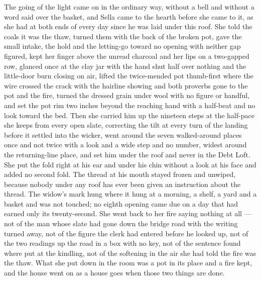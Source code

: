 The going of the light came on in the ordinary way, without a bell and without a word said over the basket, and Sella came to the hearth before she came to it, as she had at both ends of every day since he was laid under this roof. She told the coals it was the thaw, turned them with the back of the broken pot, gave the small intake, the hold and the letting-go toward no opening with neither gap figured, kept her finger above the unread charcoal and her lips on a two-gapped row, glanced once at the clay jar with the hand shut half over nothing and the little-door burn closing on air, lifted the twice-mended pot thumb-first where the wire crossed the crack with the hairline showing and both proverbs gone to the pot and the fire, turned the dressed grain under wool with no figure or handful, and set the pot rim two inches beyond the reaching hand with a half-beat and no look toward the bed. Then she carried him up the nineteen steps at the half-pace she keeps from every open slate, correcting the tilt at every turn of the landing before it settled into the wicker, went around the seven walked-around places once and not twice with a look and a wide step and no number, widest around the returning-line place, and set him under the roof and never in the Debt Loft. She put the fold right at his ear and under his chin without a look at his face and added no second fold. The thread at his mouth stayed frozen and unwiped, because nobody under any roof has ever been given an instruction about the thread. The widow's mark hung where it hung at a morning, a shelf, a yard and a basket and was not touched; no eighth opening came due on a day that had earned only its twenty-second. She went back to her fire saying nothing at all --- not of the man whose slate had gone down the bridge road with the writing turned away, not of the figure the clerk had entered before he looked up, not of the two readings up the road in a box with no key, not of the sentence found where put at the kindling, not of the softening in the air she had told the fire was the thaw. What she put down in the room was a pot in its place and a fire kept, and the house went on as a house goes when those two things are done.

\scenebreak


